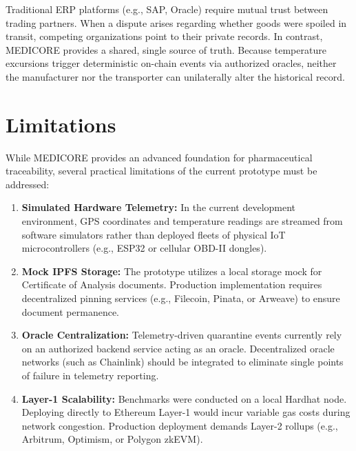 \documentclass[pdflatex,sn-mathphys-num]{sn-jnl}
\theoremstyle{thmstyleone}
\theoremstyle{thmstyletwo}
\theoremstyle{thmstylethree}
\begin{document}
Traditional ERP platforms (e.g., SAP, Oracle) require mutual trust between trading partners. When a dispute arises regarding whether goods were spoiled in transit, competing organizations point to their private records. In contrast, MEDICORE provides a shared, single source of truth. Because temperature excursions trigger deterministic on-chain events via authorized oracles, neither the manufacturer nor the transporter can unilaterally alter the historical record.


\section{Limitations}\label{sec:limitations}

While MEDICORE provides an advanced foundation for pharmaceutical traceability, several practical limitations of the current prototype must be addressed:
\begin{enumerate}
    \item \textbf{Simulated Hardware Telemetry:} In the current development environment, GPS coordinates and temperature readings are streamed from software simulators rather than deployed fleets of physical IoT microcontrollers (e.g., ESP32 or cellular OBD-II dongles).
    \item \textbf{Mock IPFS Storage:} The prototype utilizes a local storage mock for Certificate of Analysis documents. Production implementation requires decentralized pinning services (e.g., Filecoin, Pinata, or Arweave) to ensure document permanence.
    \item \textbf{Oracle Centralization:} Telemetry-driven quarantine events currently rely on an authorized backend service acting as an oracle. Decentralized oracle networks (such as Chainlink) should be integrated to eliminate single points of failure in telemetry reporting.
    \item \textbf{Layer-1 Scalability:} Benchmarks were conducted on a local Hardhat node. Deploying directly to Ethereum Layer-1 would incur variable gas costs during network congestion. Production deployment demands Layer-2 rollups (e.g., Arbitrum, Optimism, or Polygon zkEVM).
\end{enumerate}

\end{document}
